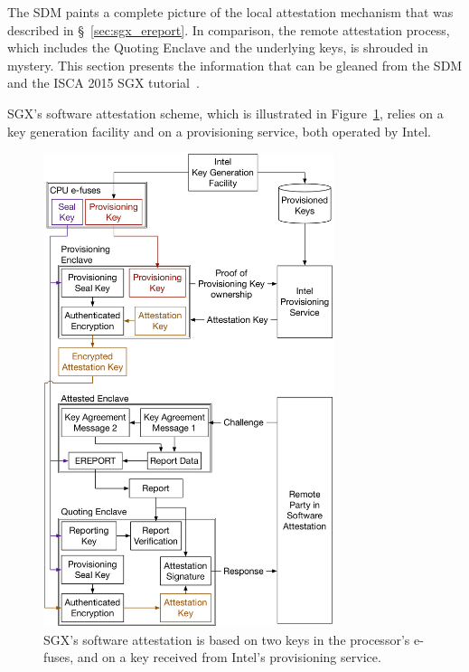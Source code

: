 

\label{sec:sgx_quoting_enclave}

The SDM paints a complete picture of the local attestation mechanism that was
described in \S~\ref{sec:sgx_ereport}. In comparison, the remote attestation
process, which includes the Quoting Enclave and the underlying keys, is
shrouded in mystery. This section presents the information that can be gleaned
from the SDM and the ISCA 2015 SGX tutorial~\cite{intel2015iscasgx}.


SGX's software attestation scheme, which is illustrated in
Figure~\ref{fig:sgx_attestation_keys}, relies on a key generation facility and
on a provisioning service, both operated by Intel.

\begin{figure}[hbt]
  \centering
  \includegraphics[width=85mm]{figures/sgx_attestation_keys.pdf}
  \caption{
    SGX's software attestation is based on two keys in the processor's e-fuses,
    and on a key received from Intel's provisioning service.
  }
  \label{fig:sgx_attestation_keys}
\end{figure}


